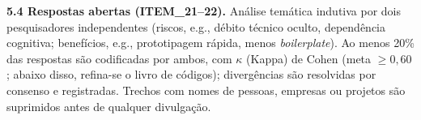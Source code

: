 \textbf{5.4 Respostas abertas (ITEM\_21--22).} Análise temática indutiva por dois pesquisadores independentes (riscos, e.g., débito técnico oculto, dependência cognitiva; benefícios, e.g., prototipagem rápida, menos \textit{boilerplate}). Ao menos 20\% das respostas são codificadas por ambos, com $\kappa$ (Kappa) de Cohen (meta $\ge 0{,}60$; abaixo disso, refina-se o livro de códigos); divergências são resolvidas por consenso e registradas. Trechos com nomes de pessoas, empresas ou projetos são suprimidos antes de qualquer divulgação.
